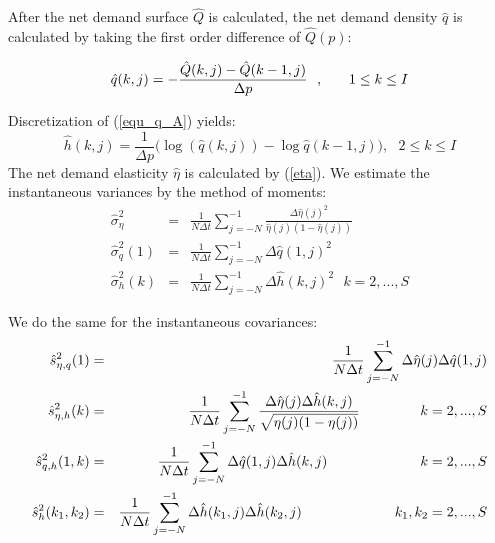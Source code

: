 \documentclass{article}
\begin{document}
After the net demand surface $\hat{Q}$ is calculated, the net demand density
$\hat{q}$ is calculated by taking the first order difference of $\hat{Q}(p)$:

\[
\hat{q}(k,j)=-\frac{\hat{Q}(k,j)-\hat{Q}(k-1,j)}{\Delta p}\text{, \ \  \ \ \
}1\leq k\leq I
\]

Discretization of (\ref{equ_q_A}) yields:%
\[
\hat{h}(k,j)=\frac{1}{\Delta p}(\log (\hat{q}(k,j))-\log {\hat{q}(k-1,j)),}%
\text{ \ \  \ \ \ }2\leq k\leq I
\]%
The net demand elasticity $\hat{\eta}$ is calculated by (\ref{eta}). We
estimate the instantaneous variances by the method of moments:
\begin{eqnarray*}
\hat{\sigma}_{\eta }^{2} &=&\frac{1}{N\Delta t}\sum_{j=-N}^{-1}\frac{\Delta
\hat{\eta}(j)^{2}}{\hat{\eta}(j)(1-\hat{\eta}(j))} \\
\hat{\sigma}_{q}^{2}(1) &=&\frac{1}{N\Delta t}\sum_{j=-N}^{-1}\Delta \hat{q}%
(1,j)^{2} \\
\hat{\sigma}_{h}^{2}(k) &=&\frac{1}{N\Delta t}\sum_{j=-N}^{-1}\Delta \hat{h}%
(k,j)^{2}\text{\ \ \ \ \ \ \ \ \ \ }k=2,...,S
\end{eqnarray*}

We do the same for the instantaneous covariances:%
\begin{eqnarray*}
\hat{s}_{\eta ,q}^{2}(1) &=&\frac{1}{N\Delta t}\sum_{j=-N}^{-1}\Delta \hat{%
\eta}(j)\Delta \hat{q}(1,j) \\
\hat{s}_{\eta ,h}^{2}(k) &=&\frac{1}{N\Delta t}\sum_{j=-N}^{-1}\frac{\Delta
\hat{\eta}(j)\Delta \hat{h}(k,j)}{\sqrt{\eta (j)(1-\eta (j))}}\text{ \ \ \ \
\ \ \ \ \ \ }k=2,...,S \\
\hat{s}_{q,h}^{2}(1,k) &=&\frac{1}{N\Delta t}\sum_{j=-N}^{-1}\Delta \hat{q}%
(1,j)\Delta \hat{h}(k,j)\text{ \ \ \ \ \ \ \ \ \ \ \ \ \ \ \ \ \ }k=2,...,S
\\
\hat{s}_{h}^{2}(k_{1},k_{2}) &=&\frac{1}{N\Delta t}\sum_{j=-N}^{-1}\Delta
\hat{h}(k_{1},j)\Delta \hat{h}(k_{2},j)\text{ \ \ \ \ \ \ \ \ \ \ \ \ \ \ \
\ \ }k_{1},k_{2}=2,...,S
\end{eqnarray*}
\end{document}
